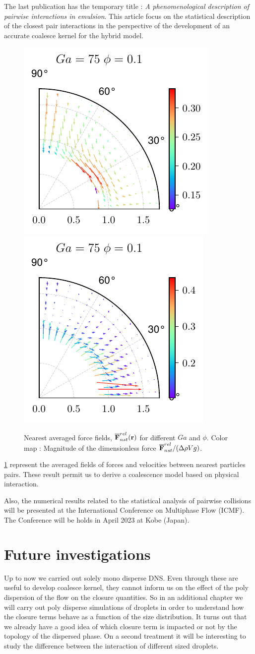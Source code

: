 The last publication has the temporary title : \textit{A phenomenological description of pairwise interactions in emulsion}. 
This article focus on the statistical description of the closest pair interactions in the  perspective of the development of an accurate coalesce kernel for the hybrid model. 
\begin{figure}
    \centering
    \includegraphics[height=0.35\textwidth]{image/HOMOGENEOUS/fDrop/U_mu_r_0_1_Ga_75_PHI_0_1.pdf}
    \includegraphics[height=0.35\textwidth]{image/HOMOGENEOUS/fDrop/F_mu_r_0_1_Ga_75_PHI_0_1.pdf}
    \caption{Nearest averaged force fields, $\overline{\textbf{F}}_{nst}^{rel}(\textbf{r})$ for different $Ga$ and $\phi$. 
    Color map : Magnitude of the dimensionless force  $\overline{\textbf{F}}_{nst}^{rel} / (\Delta \rho V g)$.}
    \label{fig:nearestfields}
\end{figure}
\ref{fig:nearestfields} represent the averaged fields of forces and velocities between nearest particles pairs. 
These result permit us to derive a coalescence model based on physical interaction. 


Also, the numerical results related to the statistical analysis of pairwise collisions will be presented at the International Conference on Multiphase Flow (ICMF). 
The Conference will be holds in April 2023 at Kobe (Japan). 

\section*{Future investigations}

Up to now we carried out solely mono disperse DNS. 
Even through these are useful to develop coalesce kernel, they cannot inform us on the effect of the poly dispersion of the flow on the closure quantities. 
So in an additional chapter we will carry out poly disperse simulations of droplets in order to understand how the closure terms behave as a function of the size distribution. 
It turns out that we already have a good idea of which closure term is impacted or not by the topology of the dispersed phase. 
On a second treatment it will be interesting to study the difference between the interaction of different sized droplets. 

